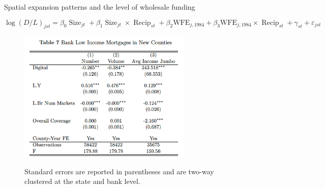 \documentclass[notes,10pt, aspectratio=169]{beamer}
\begin{document}
    
        \begin{frame}{Spatial expansion patterns and the level of wholesale funding}\label{mismatch_sorting5}
    
            $$
            \log (D / L)_{j s t}=\beta_0 \operatorname{Size}_{j t}+\beta_1 \operatorname{Size}_{j t} \times \operatorname{Recip}_{s t}+\beta_2 \mathrm{WFE}_{j, 1984}+\beta_3 \mathrm{WFE}_{j, 1984} \times \operatorname{Recip}_{s t}+\gamma_{s t}+\varepsilon_{j s t}
            $$
        \begin{figure}
            \centering
            \caption*{{Standard errors are reported in parentheses and are two-way clustered at the state and
            bank level.}}
            \includegraphics[width=0.74\textwidth]{imgs/tab7.png}
            \label{fig:my_label}
        \end{figure}
        
        \end{frame}
    
\end{document}

